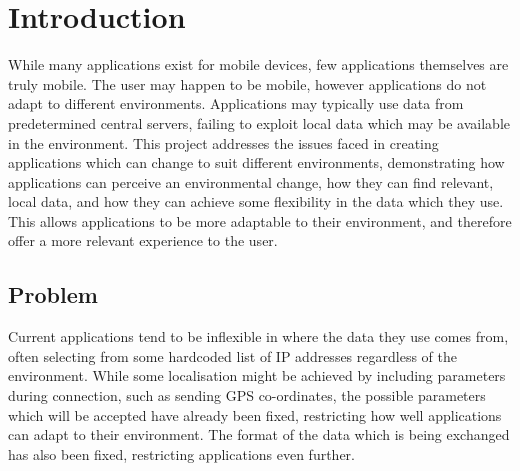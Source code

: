 \documentclass[12pt,twoside,notitlepage]{report}
\begin{document}
\bigskip
\bigskip
{}

\bigskip
\bigskip
{}

\cleardoublepage

\tableofcontents

\listoffigures

\newpage


\cleardoublepage        %

\setcounter{page}{1}
\pagestyle{headings}

\chapter{Introduction}

While many applications exist for mobile devices, few applications themselves are truly mobile. 
The user may happen to be mobile, however applications do not adapt to different environments. 
Applications may typically use data from predetermined central servers, failing to exploit local data which may be available in the environment. 
This project addresses the issues faced in creating applications which can change to suit different environments, demonstrating how applications can perceive an environmental change, how they can find relevant, local data, and how they can achieve some flexibility in the data which they use. 
This allows applications to be more adaptable to their environment, and therefore offer a more relevant experience to the user. 

\section{Problem}

Current applications tend to be inflexible in where the data they use comes from, often selecting from some hardcoded list of IP addresses regardless of the environment. 
While some localisation might be achieved by including parameters during connection, such as sending GPS co-ordinates, the possible parameters which will be accepted have already been fixed, restricting how well applications can adapt to their environment. 
The format of the data which is being exchanged has also been fixed, restricting applications even further.
\end{document}
